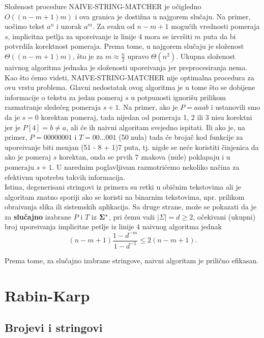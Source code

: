 \documentclass[a4paper,12pt]{article}
\begin{document}
Slo\v zenost procedure NAIVE-STRING-MATCHER je o\v cigledno $O((n - m +1)m)$ i ova granica je dosti\v zna u najgorem slu\v caju. Na primer, uo\v cimo tekst $a^n$ i uzorak $a^m$. Za svaku od $n - m + 1$ mogu\' cih vrednosti pomeraja $s$, implicitna petlja za upore\dj ivanje iz linije 4 mora se izvr\v siti $m$ puta da bi potvrdila korektnost pomeraja. Prema tome, u najgorem slu\v caju je slo\v zenost $\Theta((n - m + 1)m)$, \v sto je za $m \approx \frac{n}{2}$ upravo $\Theta(n^2)$. Ukupna slo\v zenost naivnog algoritma jednaka je slo\v zenosti upore\dj ivanja jer preprocesiranja nema.
\\

Kao \v sto \' cemo videti, NAIVE-STRING-MATCHER nije optimalna procedura za ovu vrstu problema. Glavni nedostatak ovog algoritma je u tome \v sto se dobijene informacije o tekstu za jedan pomeraj $s$ u potpunosti ignori\v su prilikom razmatranje slede\' ceg pomeraja $s + 1$. Na primer, ako je $P = aaab$ i ustanovili smo da je $s = 0$ korektan pomeraj, tada nijedan od pomeraja 1, 2 ili 3 nisu korektni jer je $P[4] = b \neq a$, ali \' ce ih naivni algoritam svejedno ispitati. Ili ako je, na primer, $P = 00000001$ i $T = 00\ldots001$ (50 nula) tada \' ce broja\v c kod funkcije za upore\dj ivanje biti menjan (51 - 8 + 1)7 puta, tj. nigde se ne\' ce koristiti \v cinjenica da ako je pomeraj $s$ korektan, onda se prvih 7 znakova (nule) poklapaju i u pomeraju $s + 1$. U narednim poglavljivam razmotri\' cemo nekoliko na\v cina za efektivnu upotrebu takvih informacija.
\\

Istina, degenerisani stringovi iz primera su retki u obi\v cnim tekstovima ali je algoritam znatno sporiji ako se koristi na binarnim tekstovima, npr. prilikom obra\dj ivanja slika ili sistemskih aplikacija. Sa druge strane, mo\v ze se pokazati da je za {\bf slu\v cajno} izabrane $P$ i $T$ iz $\bf \Sigma^\ast$, pri \v cemu va\v zi $|\Sigma| = d \geq 2$, o\v cekivani (ukupni) broj upore\dj ivanja implicitne petlje iz linije 4 naivnog algoritma jednak
$$(n - m + 1)\frac{1 - d^{-m}}{1 - d^{-1}} \leq 2(n - m + 1).$$

Prema tome, za slu\v cajno izabrane stringove, naivni algoritam je prili\v cno efikasan.



\section{Rabin-Karp}

\subsection{Brojevi i stringovi}
\end{document}
